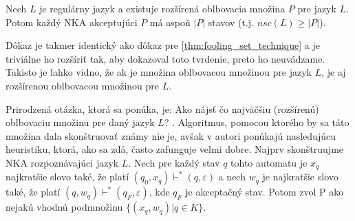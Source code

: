 \begin{theorem}
\label{thm:extended_fooling_set_technique}
Nech $ L $ je regulárny jazyk a existuje rozšírená oblbovacia množina $ P $ pre jazyk $ L $. Potom každý NKA akceptujúci $ P $ má aspoň $ |P| $ stavov (t.j. $ nsc(L) \geq |P| $).
\end{theorem}

Dôkaz je takmer identický ako dôkaz pre \ref{thm:fooling_set_technique} a je triviálne ho rozšíriť tak, aby dokazoval toto tvrdenie, preto ho neuvádzame. Takisto je lahko vidno, že ak je množina oblbovacou množinou pre jazyk $ L $, je aj rozšírenou oblbovacou množinou pre $ L $.
\par
Prirodzená otázka, ktorá sa ponúka, je: \glqq Ako nájsť čo najväčšiu (rozšírenú) oblbovaciu množinu pre daný jazyk $ L $? \grqq. Algoritmus, pomocou ktorého by sa táto množina dala skonštruovať známy nie je, avšak v 
\cite{GlaisterShalit1996} autori ponúkajú nasledujúcu heuristiku, ktorá, ako sa zdá, často zafunguje velmi dobre. Najprv skonštruujme NKA rozpoznávajúci jazyk $ L $. Nech pre každý stav $ q $ tohto automatu je $ x_q $ najkratšie slovo také, že platí $ (q_0,x_q) \vdash^{*} (q,\varepsilon) $ a nech $ w_q $ je najkratšie slovo také, že platí $ (q, w_q) \vdash^{*} (q_F,\varepsilon) $, kde $ q_F $ je akceptačný stav. Potom zvol P ako nejakú vhodnú podmnožinu $ \lbrace (x_q,w_q) | q \in K \rbrace $.

